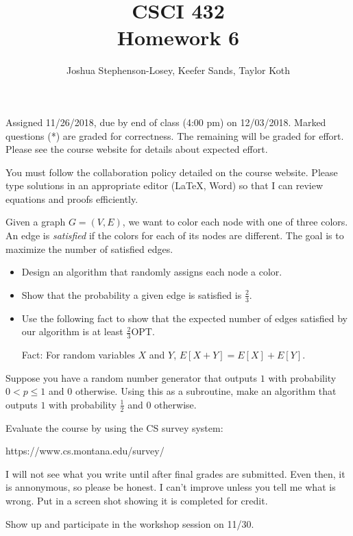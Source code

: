 \documentclass[12pt]{article}
\author{Joshua Stephenson-Losey,
Keefer Sands,
Taylor Koth}
\newenvironment{problem}[2][Problem]
{\begin{trivlist}
\item[\hskip \labelsep {\bfseries #1}\hskip \labelsep {\bfseries #2.}]}{\end{trivlist}}
\begin{document}
 
\title{CSCI 432\\Homework 6}
\date{}
\maketitle

Assigned 11/26/2018, due by end of class (4:00 pm) on 12/03/2018. Marked questions (*) are graded for correctness. The remaining will be graded for effort. Please see the course website for details about expected effort.

You must follow the collaboration policy detailed on the course website. Please type solutions in an appropriate editor (\LaTeX, Word) so that I can review equations and proofs efficiently. 

\begin{problem}{1*}
Given a graph $G=(V,E)$, we want to color each node with one of three colors. An edge is \textit{satisfied} if the colors for each of its nodes are different. The goal is to maximize the number of satisfied edges.

\begin{itemize}
\item Design an algorithm that randomly assigns each node a color.

\item Show that the probability a given edge is satisfied is $\frac{2}{3}$.

\item Use the following fact to show that the expected number of edges satisfied by our algorithm is at least $\frac{2}{3}$OPT. 

Fact: For random variables $X$ and $Y$, $E[X+Y] = E[X]+E[Y]$.
\end{itemize}
\end{problem}

\begin{problem}{2}
Suppose you have a random number generator that outputs $1$ with probability $0 < p \le 1$ and $0$ otherwise. Using this as a subroutine, make an algorithm that outputs $1$ with probability $\frac{1}{2}$ and $0$ otherwise.
\end{problem}

\begin{problem}{3*}
Evaluate the course by using the CS survey system: 

https://www.cs.montana.edu/survey/

I will not see what you write until after final grades are submitted. Even then, it is annonymous, so please be honest. I can't improve unless you tell me what is wrong. Put in a screen shot showing it is completed for credit.
\end{problem}

\begin{problem}{4}
Show up and participate in the workshop session on 11/30.
\end{problem}
 
\end{document}
